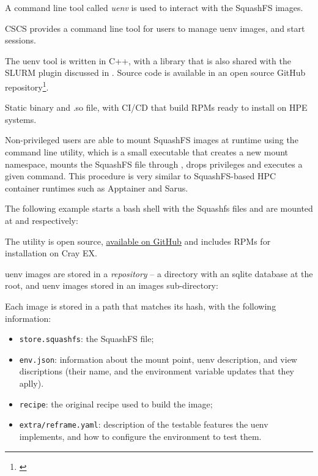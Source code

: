 A command line tool called \emph{uenv} is used to interact with the SquashFS images.

CSCS provides a command line tool for users to manage uenv images, and start sessions.

The uenv tool is written in C++, with a library that is also shared with the SLURM plugin discussed in .
Source code is available in an open source GitHub repository\footnote{\href{https://github.com/eth-cscs/uenv2}{}}.


Static binary and .so file, with CI/CD that build RPMs ready to install on HPE systems.


Non-privileged users are able to mount SquashFS images at runtime using the  command line utility, which is a small  executable that creates a new mount namespace, mounts the SquashFS file through , drops privileges and executes a given command.
This procedure is very similar to SquashFS-based HPC container runtimes such as Apptainer and Sarus.

The following example starts a bash shell with the Squashfs files  and  are mounted at  and  respectively:


The utility is open source, \href{https://github.com/eth-cscs/squashfs-mount}{available on GitHub} and includes RPMs for installation on Cray EX.


uenv images are stored in a \emph{repository} -- a directory with an sqlite database at the root, and uenv images stored in an images sub-directory:



Each image is stored in a path that matches its hash, with the following information:
\begin{itemize}
\item  \lstinline{store.squashfs}: the SquashFS file;
\item  \lstinline{env.json}: information about the mount point, uenv description, and view discriptions (their name, and the environment variable updates that they aplly).
\item  \lstinline{recipe}: the original recipe used to build the image;
\item  \lstinline{extra/reframe.yaml}: description of the testable features the uenv implements, and how to configure the environment to test them.
\end{itemize}


